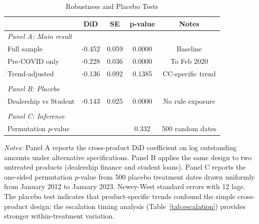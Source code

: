 \begin{table}[t]
\centering
\begin{threeparttable}
\caption{Robustness and Placebo Tests}
\label{tab:robustness}
\begin{tabular}{lcccc}
\toprule
 & DiD & SE & p-value & Notes \\
\midrule
\textit{Panel A: Main result} & & & & \\
Full sample & -0.452 & 0.059 & 0.0000 & Baseline \\
Pre-COVID only & -0.228 & 0.036 & 0.0000 & To Feb 2020 \\
Trend-adjusted & -0.136 & 0.092 & 0.1385 & CC-specific trend \\
\\[4pt]
\textit{Panel B: Placebo} & & & & \\
Dealership vs Student & -0.143 & 0.025 & 0.0000 & No rule exposure \\
\\[4pt]
\textit{Panel C: Inference} & & & & \\
Permutation $p$-value & & & 0.332 & 500 random dates \\
\bottomrule
\end{tabular}
\begin{tablenotes}[flushleft]\small
\item \textit{Notes:} Panel A reports the cross-product DiD coefficient on log outstanding amounts under alternative specifications. Panel B applies the same design to two untreated products (dealership finance and student loans). Panel C reports the one-sided permutation $p$-value from 500 placebo treatment dates drawn uniformly from January 2012 to January 2023. Newey-West standard errors with 12 lags. The placebo test indicates that product-specific trends confound the simple cross-product design; the escalation timing analysis (Table~\ref{tab:escalation}) provides stronger within-treatment variation.
\end{tablenotes}
\end{threeparttable}
\end{table}

